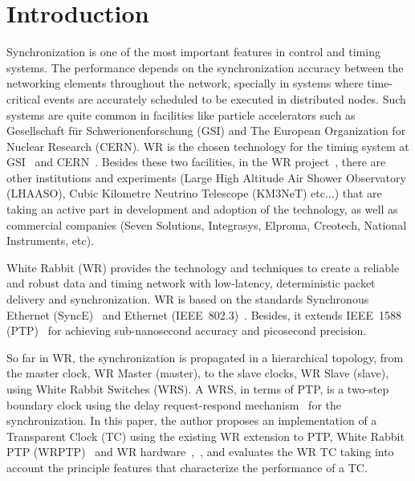 \section{Introduction}

Synchronization is one of the most important features in control and timing
systems. The performance depends on the synchronization accuracy between 
the networking elements throughout the network, specially in systems 
where time-critical events are accurately scheduled to be executed in
distributed nodes. Such systems are quite common in facilities like particle 
accelerators such as Gesellschaft f\"{u}r Schwerionenforschung (GSI) and The European 
Organization for Nuclear Research (CERN). WR is the chosen technology for the timing system 
at GSI~\cite{biblio:FAIRtimingSystem} and CERN~\cite{biblio:cernWr}. 
Besides these two facilities, in the WR project~\cite{biblio:wrproj}, there are other
institutions and experiments (Large High Altitude Air Shower Observatory
(LHAASO), Cubic Kilometre Neutrino Telescope (KM3NeT) etc...) that are taking an active part in 
development and adoption of the technology, as well as commercial companies (Seven Solutions, 
Integrasys, Elproma, Creotech, National Instruments, etc).

White Rabbit (WR) provides the technology and techniques to create a 
reliable and robust data and timing network with low-latency, deterministic packet 
delivery and synchronization. WR is based on the standards Synchronous Ethernet 
(SyncE)~\cite{biblio:synch} and  Ethernet (IEEE~802.3)~\cite{biblio:ethernet}. Besides, it extends IEEE~1588 
(PTP)~\cite{biblio:ptp} for achieving sub-nanosecond accuracy and picosecond precision.

So far in WR, the synchronization is propagated in a hierarchical topology, from the master clock, 
WR Master (master), to the slave clocks, WR Slave (slave), using White Rabbit Switches (WRS). 
A WRS, in terms of PTP, is a two-step boundary clock using the delay request-respond mechanism~\cite{biblio:ptp}  
for the synchronization. In this paper, the author proposes an implementation
of a Transparent Clock (TC) using the existing WR extension to PTP, White Rabbit
PTP (WRPTP)~\cite{biblio:wrptp} 
and WR hardware~\cite{biblio:spec},~\cite{biblio:wrswitch}, and evaluates the
WR TC taking into account the principle features that characterize the performance of a TC. 


